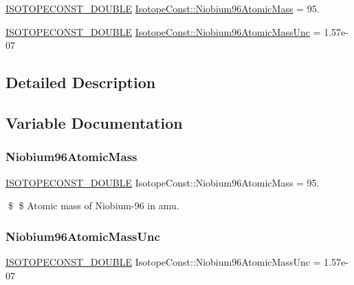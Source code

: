 \begin{DoxyCompactItemize}
\item 
\mbox{\hyperlink{group___isotope_const-_macros_ga8f45a7272ce02c0b4c65c44636ed719a}{I\+S\+O\+T\+O\+P\+E\+C\+O\+N\+S\+T\+\_\+\+D\+O\+U\+B\+LE}} \mbox{\hyperlink{group___isotope_const-_niobium-_nb96_ga877b2197aae196d0e34c87e9c54264cb}{Isotope\+Const\+::\+Niobium96\+Atomic\+Mass}} = 95.
\item 
\mbox{\hyperlink{group___isotope_const-_macros_ga8f45a7272ce02c0b4c65c44636ed719a}{I\+S\+O\+T\+O\+P\+E\+C\+O\+N\+S\+T\+\_\+\+D\+O\+U\+B\+LE}} \mbox{\hyperlink{group___isotope_const-_niobium-_nb96_ga118bd9b046241c0969403f812ff5c8b4}{Isotope\+Const\+::\+Niobium96\+Atomic\+Mass\+Unc}} = 1.\+57e-\/07
\end{DoxyCompactItemize}


\subsection{Detailed Description}


\subsection{Variable Documentation}
\mbox{\label{group___isotope_const-_niobium-_nb96_ga877b2197aae196d0e34c87e9c54264cb}} 
\subsubsection{\texorpdfstring{Niobium96\+Atomic\+Mass}{Niobium96AtomicMass}}
{\footnotesize\ttfamily \mbox{\hyperlink{group___isotope_const-_macros_ga8f45a7272ce02c0b4c65c44636ed719a}{I\+S\+O\+T\+O\+P\+E\+C\+O\+N\+S\+T\+\_\+\+D\+O\+U\+B\+LE}} Isotope\+Const\+::\+Niobium96\+Atomic\+Mass = 95.}

\$ \$ Atomic mass of Niobium-\/96 in amu. \mbox{\label{group___isotope_const-_niobium-_nb96_ga118bd9b046241c0969403f812ff5c8b4}} 
\subsubsection{\texorpdfstring{Niobium96\+Atomic\+Mass\+Unc}{Niobium96AtomicMassUnc}}
{\footnotesize\ttfamily \mbox{\hyperlink{group___isotope_const-_macros_ga8f45a7272ce02c0b4c65c44636ed719a}{I\+S\+O\+T\+O\+P\+E\+C\+O\+N\+S\+T\+\_\+\+D\+O\+U\+B\+LE}} Isotope\+Const\+::\+Niobium96\+Atomic\+Mass\+Unc = 1.\+57e-\/07}

